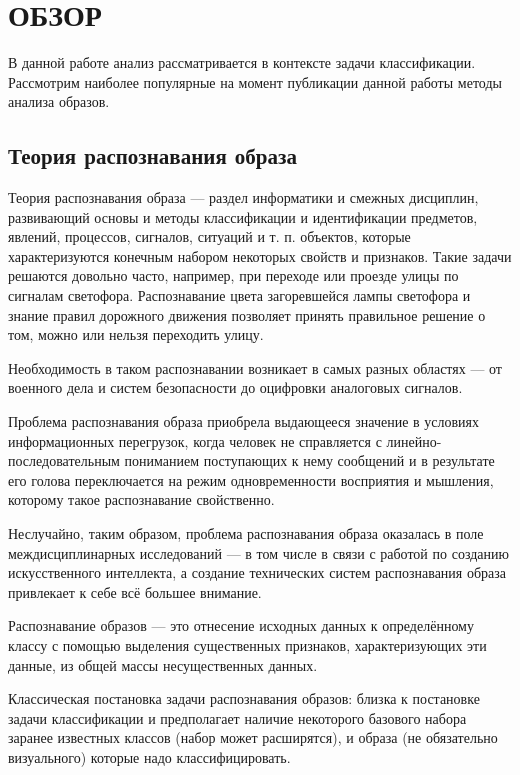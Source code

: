 \chapter{ОБЗОР} \label{chapt2}
В данной работе анализ рассматривается в контексте задачи классификации. Рассмотрим наиболее популярные на момент публикации данной работы методы анализа образов.

\section{Теория распознавания образа}

Теория распознавания образа --- раздел информатики и смежных дисциплин, развивающий основы и методы классификации и идентификации предметов, явлений, процессов, сигналов, ситуаций и т. п. объектов, которые характеризуются конечным набором некоторых свойств и признаков. Такие задачи решаются довольно часто, например, при переходе или проезде улицы по сигналам светофора. Распознавание цвета загоревшейся лампы светофора и знание правил дорожного движения позволяет принять правильное решение о том, можно или нельзя переходить улицу.

Необходимость в таком распознавании возникает в самых разных областях --- от военного дела и систем безопасности до оцифровки аналоговых сигналов.

Проблема распознавания образа приобрела выдающееся значение в условиях информационных перегрузок, когда человек не справляется с линейно-последовательным пониманием поступающих к нему сообщений и в результате его голова переключается на режим одновременности восприятия и мышления, которому такое распознавание свойственно.

Неслучайно, таким образом, проблема распознавания образа оказалась в поле междисциплинарных исследований --- в том числе в связи с работой по созданию искусственного интеллекта, а создание технических систем распознавания образа привлекает к себе всё большее внимание.

Распознавание образов --- это отнесение исходных данных к определённому классу с помощью выделения существенных признаков, характеризующих эти данные, из общей массы несущественных данных.

Классическая постановка задачи распознавания образов: близка к постановке задачи классификации и предполагает наличие некоторого базового набора заранее известных классов (набор может расширятся), и образа (не обязательно визуального) которые надо классифицировать.

